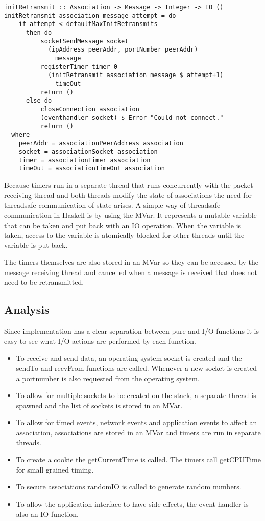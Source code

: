 \begin{lstlisting}[caption={The init retransmission function}, label={lst-retransmission}]
initRetransmit :: Association -> Message -> Integer -> IO ()
initRetransmit association message attempt = do
    if attempt < defaultMaxInitRetransmits
      then do
          socketSendMessage socket 
            (ipAddress peerAddr, portNumber peerAddr)
              message
          registerTimer timer 0
            (initRetransmit association message $ attempt+1)
              timeOut
          return ()
      else do
          closeConnection association
          (eventhandler socket) $ Error "Could not connect."
          return ()
  where
    peerAddr = associationPeerAddress association
    socket = associationSocket association
    timer = associationTimer association
    timeOut = associationTimeOut association
\end{lstlisting}
Because timers run in a separate thread that runs concurrently with the packet receiving thread and both threads modify the state of associations the need for threadsafe communication of state arises. 
A simple way of threadsafe communication in Haskell is by using the MVar.
It represents a mutable variable that can be taken and put back with an IO operation.
When the variable is taken, access to the variable is atomically blocked for other threads until the variable is put back. 

The timers themselves are also stored in an MVar so they can be accessed by the message receiving thread and cancelled when a message is received that does not need to be retransmitted.

\subsection{Analysis}
Since implementation has a clear separation between pure and I/O functions it is easy to see what I/O actions are performed by each function. 

\begin{itemize}
\item To receive and send data, an operating system socket is created and the sendTo and recvFrom functions are called. Whenever a new socket is created a portnumber is also requested from the operating system.
\item To allow for multiple sockets to be created on the stack, a separate thread is spawned and the list of sockets is stored in an MVar.
\item To allow for timed events, network events and application events to affect an association, associations are stored in an MVar and timers are run in separate threads.
\item To create a cookie the getCurrentTime is called. The timers call getCPUTime for small grained timing.
\item To secure associations randomIO is called to generate random numbers.
\item To allow the application interface to have side effects, the event handler is also an IO function.
\end{itemize}

